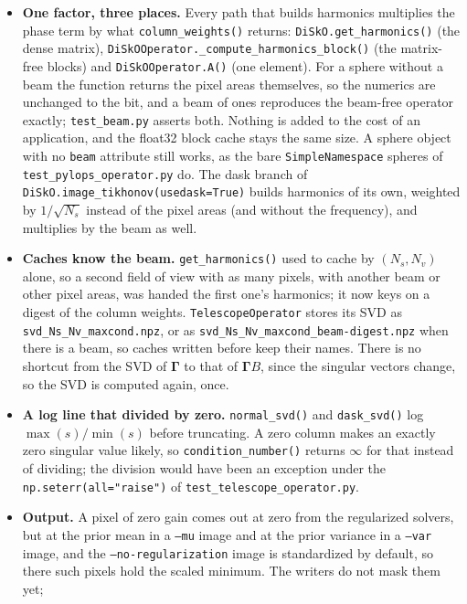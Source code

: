 \documentclass[11pt,a4paper]{article}
\newcommand{\Gammam}{\boldsymbol{\Gamma}}
\newcommand{\Gammab}{\Gammam B}
\begin{document}
\begin{itemize}
\item \textbf{One factor, three places.} Every path that builds harmonics
  multiplies the phase term by what \texttt{column\_weights()} returns:
  \texttt{DiSkO.get\_harmonics()} (the dense matrix),
  \texttt{DiSkOOperator.\_compute\_harmonics\_block()} (the matrix-free
  blocks) and \texttt{DiSkOOperator.A()} (one element). For a sphere without
  a beam the function returns the pixel areas themselves, so the numerics
  are unchanged to the bit, and a beam of ones reproduces the beam-free
  operator exactly; \texttt{test\_beam.py} asserts both. Nothing is added to
  the cost of an application, and the float32 block cache stays the same
  size. A sphere object with no \texttt{beam} attribute still works, as the
  bare \texttt{SimpleNamespace} spheres of \texttt{test\_pylops\_operator.py}
  do. The dask branch of \texttt{DiSkO.image\_tikhonov(usedask=True)} builds
  harmonics of its own, weighted by $1/\sqrt{N_s}$ instead of the pixel areas
  (and without the frequency), and multiplies by the beam as well.
\item \textbf{Caches know the beam.} \texttt{get\_harmonics()} used to cache
  by $(N_s,N_v)$ alone, so a second field of view with as many pixels, with
  another beam or other pixel areas, was handed the first one's harmonics; it
  now keys on a digest of the column weights. \texttt{TelescopeOperator}
  stores its SVD as \texttt{svd\_Ns\_Nv\_maxcond.npz}, or as
  \texttt{svd\_Ns\_Nv\_maxcond\_beam-digest.npz} when there is a beam, so
  caches written before keep their names. There is no shortcut from the SVD
  of $\Gammam$ to that of $\Gammab$, since the singular vectors change, so
  the SVD is computed again, once.
\item \textbf{A log line that divided by zero.} \texttt{normal\_svd()} and
  \texttt{dask\_svd()} log $\max(s)/\min(s)$ before truncating. A zero column
  makes an exactly zero singular value likely, so \texttt{condition\_number()}
  returns $\infty$ for that instead of dividing; the division would have been
  an exception under the \texttt{np.seterr(all="raise")} of
  \texttt{test\_telescope\_operator.py}.
\item \textbf{Output.} A pixel of zero gain comes out at zero from the
  regularized solvers, but at the prior mean in a \texttt{--mu} image and at
  the prior variance in a \texttt{--var} image, and the
  \texttt{--no-regularization} image is standardized by default, so there
  such pixels hold the scaled minimum. The writers do not mask them yet;

\end{itemize}
\end{document}
